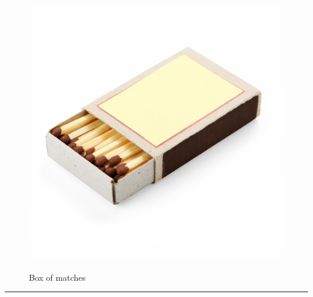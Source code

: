 \documentclass{article}
\begin{document}
    \begin{figure}[H]
        \centering
        \begin{minipage}{0.25\textwidth}
            \centering
            \includegraphics[width=\textwidth]{../SurvivalItemImages/matchbox}
        \end{minipage}\hfill
        \begin{minipage}{0.7\textwidth}
            \centering
            \Large Box of matches
        \end{minipage}
    \end{figure}
    \vspace{-0.8em}
    \noindent\rule{\textwidth}{0.4pt}
            
\end{document}
